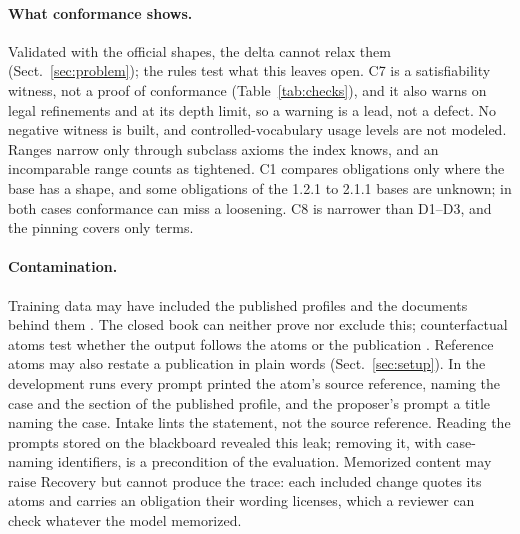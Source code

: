 \paragraph{What conformance shows.}
Validated with the official shapes, the delta cannot relax them (Sect.~\ref{sec:problem}); the rules test what
this leaves open.
C7 is a satisfiability witness, not a proof of conformance (Table~\ref{tab:checks}), and it also warns on legal %
refinements and at its depth limit, so a warning is a lead, not a defect.
No negative witness is built, and controlled-vocabulary usage levels are not modeled.
Ranges narrow only through subclass axioms the index knows, and an incomparable range counts as tightened. %
C1 compares obligations only where the base has a shape, and some obligations of the 1.2.1 to 2.1.1 bases are %
unknown; in both cases conformance can miss a loosening. %
C8 is narrower than D1--D3, and the pinning covers only  terms. %

\paragraph{Contamination.}
Training data may have included the published profiles and the documents behind them \cite{sainz2023contamination}.
The closed book can neither prove nor exclude this; counterfactual atoms test whether the output follows the atoms
or the publication \cite{wu2024reciting}.
Reference atoms may also restate a publication in plain words (Sect.~\ref{sec:setup}).
In the development runs every prompt printed the atom's source reference, naming the case and the section of the %
published profile, and the proposer's prompt a title naming the case. %
Intake lints the statement, not the source reference. %
Reading the prompts stored on the blackboard revealed this leak; removing it, with case-naming identifiers, is a
precondition of the evaluation.
 
Memorized content may raise Recovery but cannot produce the trace: each included change quotes its atoms and
carries an obligation their wording licenses, which a reviewer can check whatever the model memorized.

